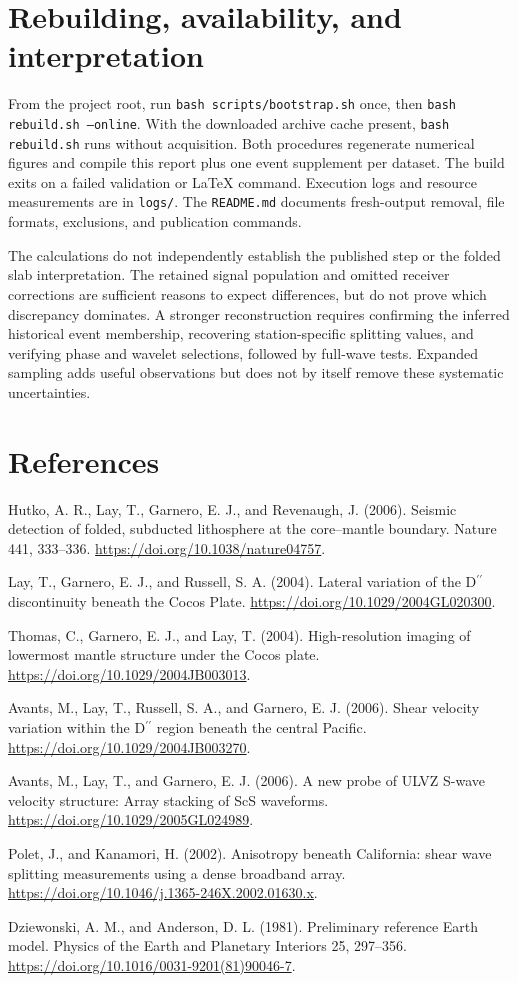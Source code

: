 \documentclass[10pt]{article}
\begin{document}
\section{Rebuilding, availability, and interpretation}
From the project root, run \texttt{bash scripts/bootstrap.sh} once, then
\texttt{bash rebuild.sh --online}. With the downloaded archive cache present,
\texttt{bash rebuild.sh} runs without acquisition. Both procedures regenerate
numerical figures and compile this report plus one event supplement per dataset.
The build exits on a failed validation or LaTeX command. Execution logs and
resource measurements are in \texttt{logs/}. The \texttt{README.md} documents
fresh-output removal, file formats, exclusions, and publication commands.

The calculations do not independently establish the published step or the folded
slab interpretation. The retained signal population and omitted receiver corrections
are sufficient reasons to expect differences, but do not prove which discrepancy
dominates. A stronger reconstruction requires confirming the inferred historical
event membership, recovering station-specific splitting values, and verifying phase
and wavelet selections, followed by full-wave tests. Expanded sampling adds useful
observations but does not by itself remove these systematic uncertainties.

\section*{References}
Hutko, A. R., Lay, T., Garnero, E. J., and Revenaugh, J. (2006).
Seismic detection of folded, subducted lithosphere at the core--mantle boundary.
Nature 441, 333--336. \url{https://doi.org/10.1038/nature04757}.

Lay, T., Garnero, E. J., and Russell, S. A. (2004). Lateral variation of the
D$^{\prime\prime}$ discontinuity beneath the Cocos Plate.
\url{https://doi.org/10.1029/2004GL020300}.

Thomas, C., Garnero, E. J., and Lay, T. (2004). High-resolution imaging of lowermost
mantle structure under the Cocos plate. \url{https://doi.org/10.1029/2004JB003013}.

Avants, M., Lay, T., Russell, S. A., and Garnero, E. J. (2006). Shear velocity
variation within the D$^{\prime\prime}$ region beneath the central Pacific.
\url{https://doi.org/10.1029/2004JB003270}.

Avants, M., Lay, T., and Garnero, E. J. (2006). A new probe of ULVZ S-wave
velocity structure: Array stacking of ScS waveforms.
\url{https://doi.org/10.1029/2005GL024989}.

Polet, J., and Kanamori, H. (2002). Anisotropy beneath California: shear wave
splitting measurements using a dense broadband array.
\url{https://doi.org/10.1046/j.1365-246X.2002.01630.x}.

Dziewonski, A. M., and Anderson, D. L. (1981). Preliminary reference Earth model.
Physics of the Earth and Planetary Interiors 25, 297--356.
\url{https://doi.org/10.1016/0031-9201(81)90046-7}.
\end{document}
